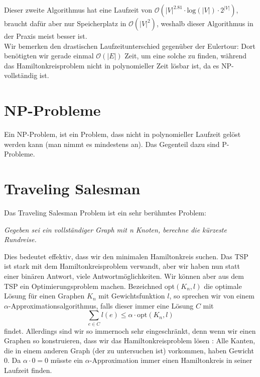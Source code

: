 Dieser zweite Algorithmus hat eine Laufzeit von $\mathcal{O}(|V|^{2.81} \cdot \text{log}(|V|) \cdot 2^{|V|})$, braucht
dafür aber nur Speicherplatz in $\mathcal{O}(|V|^2)$, weshalb dieser Algorithmus in der Praxis meist besser ist. \\

Wir bemerken den drastischen Laufzeitunterschied gegenüber der Eulertour: Dort benötigten wir gerade 
einmal $\mathcal{O}(|E|)$ Zeit, um eine solche zu finden, während das Hamiltonkreisproblem nicht in polynomieller Zeit lösbar ist, da es 
NP-vollständig ist.

\section{NP-Probleme}

\begin{definition}
    Ein NP-Problem, ist ein Problem, dass nicht in polynomieller Laufzeit gelöst werden kann 
    (man nimmt es mindestens an). Das Gegenteil dazu sind P-Probleme.
\end{definition}

\section{Traveling Salesman}

Das Traveling Salesman Problem ist ein sehr berühmtes Problem:

\begin{definition}
    \textit{Gegeben sei ein vollständiger Graph mit n Knoten, berechne die kürzeste Rundreise.}
\end{definition}
\bigskip

Dies bedeutet effektiv, dass wir den minimalen Hamiltonkreis suchen. Das TSP ist stark mit dem Hamiltonkreisproblem
verwandt, aber wir haben nun statt einer binären Antwort, viele Antwortmöglichkeiten. Wir können aber aus dem TSP
ein Optimierungsproblem machen. Bezeichned opt$(K_n,l)$ die optimale Lösung für einen Graphen $K_n$ mit
Gewichtsfunktion $l$, so sprechen wir von einem $\alpha$-Approximationsalgorithmus, falls dieser immer eine 
Lösung $C$ mit
$$\sum_{e \in C} l(e) \leq \alpha \cdot \text{opt}(K_n, l)$$
findet. Allerdings sind wir so immernoch sehr eingeschränkt, denn wenn wir einen Graphen so konstruieren, dass
wir das Hamiltonkreisproblem lösen : Alle Kanten, die in einem anderen Graph (der zu untersuchen ist) vorkommen,
haben Gewicht 0. Da $\alpha \cdot 0 = 0$ müsste ein $\alpha$-Approximation immer einen Hamiltonkreis in seiner
Laufzeit finden. \\

